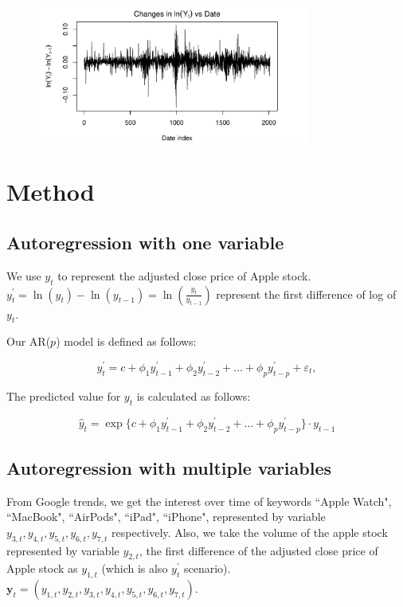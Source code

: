 \documentclass[conference,onecolumn,11pt]{IEEEtran}
\begin{document}
\begin{figure}[htpb]
	\centering
	\includegraphics[width=0.8\textwidth]{pic/log_AdjClosed.pdf}
	\caption{}
	\label{fig:dlog}
\end{figure}


\section{Method}

\subsection*{Autoregression with one variable}\label{mod1}

We use $y_{t}$ to represent the adjusted close price of Apple stock.
$y^{'}_{t} = \ln(y_{t})-\ln(y_{t-1}) = \ln(\frac{y_{t}}{y_{t-1}})$ represent the first difference of log of $y_{t}$.


Our AR($p$) model is defined as follows:

\[
y^{'}_{t} = c + \phi_{1}y^{'}_{t-1} + \phi_{2}y^{'}_{t-2} + \dots + \phi_{p}y^{'}_{t-p} + \varepsilon_{t},
\]

The predicted value for $y_t$ is calculated as follows:

\[
\hat{y}_t = \exp\{c + \phi_{1}y^{'}_{t-1} + \phi_{2}y^{'}_{t-2} + \dots + \phi_{p}y^{'}_{t-p}\}\cdot y_{t-1}
\]

\subsection*{Autoregression with multiple variables}
\label{mod2}

From Google trends, we get the interest over time of keywords ``Apple Watch", ``MacBook", ``AirPods", ``iPad", ``iPhone", represented by variable $y_{3,t},y_{4,t},y_{5,t},y_{6,t},y_{7,t}$ respectively. Also, we take the volume of the apple stock represented by variable $y_{2,t}$, the first difference of the adjusted close price of Apple stock as $y_{1,t}$ (which is also $y^{'}_t$ scenario). $\mathbf{y}_t = (y_{1,t},y_{2,t},y_{3,t},y_{4,t},y_{5,t},y_{6,t},y_{7,t})$.
\end{document}
